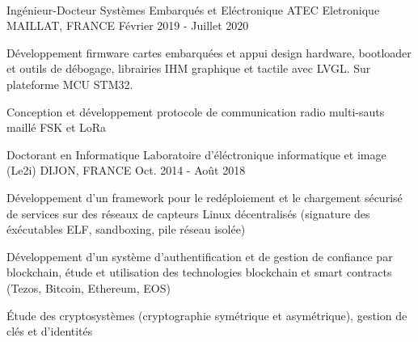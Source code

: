~\vspace{0.2cm}



\begin{cventries}

  \cventry
    {Ingénieur-Docteur Systèmes Embarqués et Eléctronique} %
    {ATEC Eletronique} %
    {MAILLAT, FRANCE} %
    {Février 2019 - Juillet 2020} %
    {
      \begin{cvitems} %
      \item {Développement firmware cartes embarquées et appui design hardware, bootloader et outils de débogage, librairies IHM graphique et tactile avec LVGL. Sur plateforme MCU STM32.}
      \item {Conception et développement protocole de communication radio multi-sauts maillé FSK et LoRa}
      \end{cvitems}
    }

  \cventry
    {Doctorant en Informatique} %
    {Laboratoire d'éléctronique informatique et image (Le2i)} %
    {DIJON, FRANCE} %
    {Oct. 2014 - Août 2018} %
    {
      \begin{cvitems} %
      \item {Développement d'un framework pour le redéploiement et le chargement sécurisé de services sur des réseaux de capteurs Linux décentralisés (signature des éxécutables ELF, sandboxing, pile réseau isolée)}
      \item {Développement d'un système d'authentification et de gestion de confiance par blockchain, étude et utilisation des technologies blockchain et smart contracts (Tezos, Bitcoin, Ethereum, EOS)}
      \item {\'Etude des cryptosystèmes (cryptographie symétrique et asymétrique), gestion de clés et d'identités}
      \end{cvitems}
    }


\end{cventries}
